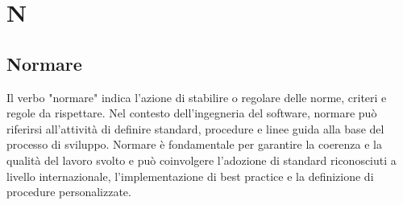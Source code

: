 \section{N}

\vspace{2em}
\subsection*{Normare}
\par Il verbo "normare" indica l'azione di stabilire o regolare delle norme, criteri e regole da rispettare. Nel contesto dell'ingegneria del software, normare può riferirsi all'attività di definire standard, procedure e linee guida alla base del processo di sviluppo. Normare è fondamentale per garantire la coerenza e la qualità del lavoro svolto e può coinvolgere l'adozione di standard riconosciuti a livello internazionale, l'implementazione di best practice e la definizione di procedure personalizzate.

